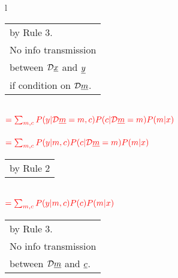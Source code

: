 \begin{longtable}{l}
\begin{tabular}{l}
by Rule 3.\\
No info transmission\\
between ${\cal D}{\underline{x}}$ and ${\underline{y}}$\\
if condition on ${\cal D} {\underline{m}}$.
\end{tabular}
\\
$\color{red}=
\sum_{m,c}
P(y|{\cal D}{\underline{m}}=m, c)
P(c|{\cal D}{\underline{m}}=m)
P(m|x)$
\\
\\
$\color{red}=
\sum_{m,c}
P(y|m, c)
P(c|{\cal D}{\underline{m}}=m)
P(m|x)$
\\
\begin{tabular}{l}
\\
by Rule 2
\end{tabular}
\\
$\color{red}=
\sum_{m,c}
P(y|m, c)
P(c)
P(m|x)$
\\
\xymatrix{\\=}
\begin{tabular}{l}
\\
by Rule 3.
\\
No info transmission\\
between ${\cal D}{\underline{m}}$ and ${\underline{c}}$.
\end{tabular}
\end{longtable}



